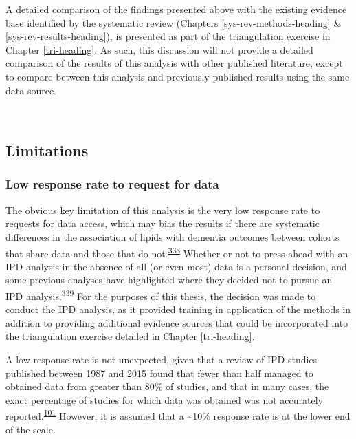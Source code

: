 \documentclass[a4paper, twoside]{templates/ociamthesis}
\begin{document}
A detailed comparison of the findings presented above with the existing evidence base identified by the systematic review (Chapters \ref{sys-rev-methods-heading} \& \ref{sys-rev-results-heading}), is presented as part of the triangulation exercise in Chapter \ref{tri-heading}. As such, this discussion will not provide a detailed comparison of the results of this analysis with other published literature, except to compare between this analysis and previously published results using the same data source.

~

\hypertarget{limitations-1}{%
\subsection{Limitations}\label{limitations-1}}

\hypertarget{low-response-rate-to-request-for-data}{%
\subsubsection{Low response rate to request for data}\label{low-response-rate-to-request-for-data}}

The obvious key limitation of this analysis is the very low response rate to requests for data access, which may bias the results if there are systematic differences in the association of lipids with dementia outcomes between cohorts that share data and those that do not.\textsuperscript{\protect\hyperlink{ref-ahmed2012}{338}} Whether or not to press ahead with an IPD analysis in the absence of all (or even most) data is a personal decision, and some previous analyses have highlighted where they decided not to pursue an IPD analysis.\textsuperscript{\protect\hyperlink{ref-jaspers2014}{339}} For the purposes of this thesis, the decision was made to conduct the IPD analysis, as it provided training in application of the methods in addition to providing additional evidence sources that could be incorporated into the triangulation exercise detailed in Chapter \ref{tri-heading}.

A low response rate is not unexpected, given that a review of IPD studies published between 1987 and 2015 found that fewer than half managed to obtained data from greater than 80\% of studies, and that in many cases, the exact percentage of studies for which data was obtained was not accurately reported.\textsuperscript{\protect\hyperlink{ref-nevitt2017}{101}} However, it is assumed that a \textasciitilde10\% response rate is at the lower end of the scale.
\end{document}
